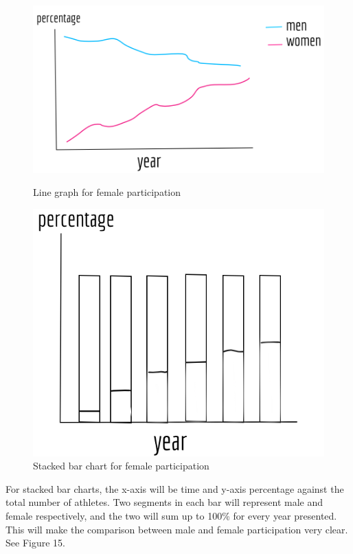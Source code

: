\documentclass[12pt]{article}
\begin{document}
\begin{figure}[!t]
  \begin{minipage}[b]{0.45\textwidth}
  \centering
    \includegraphics[scale=0.29]{pics/1.png}
    \caption{\footnotesize Line graph for female participation}
    \label{fig:1}
  \end{minipage}
  \hfill
  \begin{minipage}[b]{0.45\textwidth}
  \centering
    \includegraphics[scale=0.3]{pics/2.png}
    \caption{\footnotesize Stacked bar chart for female participation}
    \label{fig:2}
  \end{minipage}
\end{figure}

For stacked bar charts, the x-axis will be time and y-axis percentage against the total number of athletes. Two segments in each bar will represent male and female respectively, and the two will sum up to 100\% for every year presented. This will make the comparison between male and female participation very clear. See Figure 15.
\end{document}
